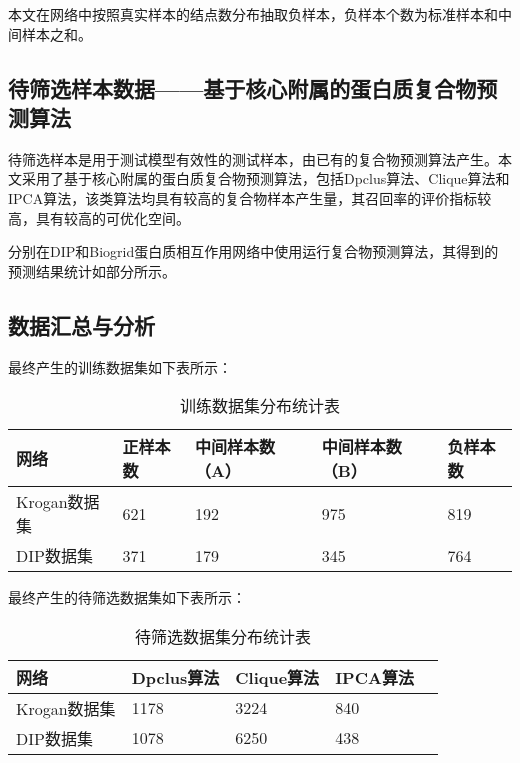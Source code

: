 本文在网络中按照真实样本的结点数分布抽取负样本，负样本个数为标准样本和中间样本之和。

\subsection{待筛选样本数据——基于核心附属的蛋白质复合物预测算法}
\label{subsection:allSample:coreAttachSampleData}

待筛选样本是用于测试模型有效性的测试样本，由已有的复合物预测算法产生。本文采用了基于核心附属的蛋白质复合物预测算法，包括Dpclus算法、Clique算法和IPCA算法，该类算法均具有较高的复合物样本产生量，其召回率的评价指标较高，具有较高的可优化空间。

分别在DIP和Biogrid蛋白质相互作用网络中使用运行复合物预测算法，其得到的预测结果统计如\label{subsection:allSample:summary}部分所示。




\subsection{数据汇总与分析}
\label{subsection:allSample:summary}

最终产生的训练数据集如下表所示：

\begin{table}[h]
    \centering
    \caption{训练数据集分布统计表}
    \label{tab:datasets:statistic}
    \begin{tabular}{C{3cm}C{2cm}C{3cm}C{3cm}C{2cm}}
        \toprule
        \textbf{网络} & \textbf{正样本数} & \textbf{中间样本数（A）} & \textbf{中间样本数（B）} & \textbf{负样本数} \\
        \midrule
        Krogan数据集  & 621               & 192                      & 975                      & 819               \\
        DIP数据集     & 371               & 179                      & 345                      & 764               \\
        \bottomrule
    \end{tabular}
\end{table}

最终产生的待筛选数据集如下表所示：

\begin{table}[h]
    \centering
    \caption{待筛选数据集分布统计表}
    \label{tab:datasets:statistic}
    \begin{tabular}{C{3cm}C{2cm}C{3cm}C{3cm}C{2cm}}
        \toprule
        \textbf{网络} & \textbf{Dpclus算法} & \textbf{Clique算法} & \textbf{IPCA算法} \\
        \midrule
        Krogan数据集  & 1178                & 3224                & 840               \\
        DIP数据集     & 1078                & 6250                & 438               \\
        \bottomrule
    \end{tabular}
\end{table}


